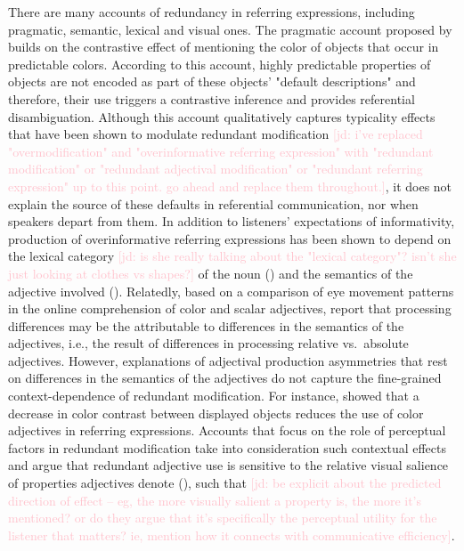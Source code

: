 \documentclass[12pt,letterpaper]{article}
\newcommand{\jd}[1]{\textcolor{Pink}{[jd: #1]}}
\begin{document}
There are many accounts of redundancy in referring expressions, including pragmatic, semantic, lexical and visual ones. The pragmatic account proposed by \citet{Sedivy2003} builds on the contrastive effect of mentioning the color of objects that occur in predictable colors. According to this account, highly predictable properties of objects are not encoded as part of these objects' "default descriptions" and therefore, their use triggers a contrastive inference and provides referential disambiguation. Although this account qualitatively captures typicality effects that have been shown to modulate redundant modification \jd{i've replaced "overmodification" and "overinformative referring expression" with "redundant modification" or "redundant adjectival modification" or "redundant referring expression" up to this point. go ahead and replace them throughout.}, it does not explain the source of these defaults in referential communication, nor when speakers depart from them. In addition to listeners' expectations of informativity, production of overinformative referring expressions has been shown to depend on the lexical category \jd{is she really talking about the "lexical category"? isn't she just looking at clothes vs shapes?} of the noun (\citealt{RubioFernandez2016}) and the semantics of the adjective involved (\citealt{RubioEtAl2019, Sedivy2003}). Relatedly, based on a comparison of eye movement patterns in the online comprehension of color and scalar adjectives, \citet{AparicioEtAl2018} report that processing  differences may be the attributable to differences in the semantics of the adjectives, i.e., the result of differences in processing relative vs.~absolute adjectives. However, explanations of adjectival production asymmetries that rest on differences in the semantics of the adjectives do not capture the fine-grained context-dependence of redundant modification. For instance, \citet{ViethenEtAl2017} showed that  a decrease in color contrast between displayed objects reduces the use of color adjectives in referring expressions. Accounts that focus on the role of perceptual factors in redundant modification take into consideration such contextual effects and argue that redundant adjective use is sensitive to the relative visual salience of properties  adjectives denote (\citealt{RubioEtAl2019, Taranskeen2015}), such that \jd{be explicit about the predicted direction of effect -- eg, the more visually salient a property is, the more it's mentioned? or do they argue that it's specifically the perceptual utility for the listener that matters? ie, mention how it connects with communicative efficiency}. 
\end{document}
